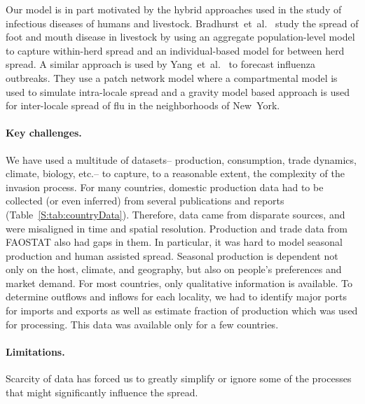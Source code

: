 \documentclass[11pt]{article}
\theoremstyle{definition}
\begin{document}
Our model is in part motivated by the hybrid approaches used in the study
of infectious diseases of humans and livestock.
Bradhurst~et~al.~\cite{bradhurst2015hybrid} study the spread of foot and
mouth disease in livestock by using an aggregate population-level model to
capture within-herd spread and an individual-based model for between herd
spread. A similar approach is used by
Yang~et~al.~\cite{yang2016} to forecast influenza outbreaks. They use a
patch network model where a compartmental model is used to simulate 
intra-locale spread and a gravity model based approach is used for
inter-locale spread of flu in the neighborhoods of New~York.

\paragraph{Key challenges.}
We have used a multitude of datasets-- production, consumption, trade
dynamics, climate, biology, etc.-- to capture, to a reasonable extent, the
complexity of the invasion process.  For many countries, domestic
production data had to be collected (or even inferred) from several
publications and reports (Table~\ref{S:tab:countryData}). Therefore, data
came from disparate sources, and were misaligned in time and spatial
resolution. Production and trade data from FAOSTAT also had gaps in them.
In particular, it was hard to model seasonal production and human assisted
spread. Seasonal production is dependent not only on the host, climate, and
geography, but also on people's preferences and market demand. For most
countries, only qualitative information is available.
To determine outflows and inflows for each locality,
we had to identify major ports for imports and exports as well as estimate
fraction of production which was used for processing. This data was
available only for a few countries.

\paragraph{Limitations.}
Scarcity of data has forced us to greatly simplify or ignore some of the
processes that might significantly influence the spread. 
\end{document}
